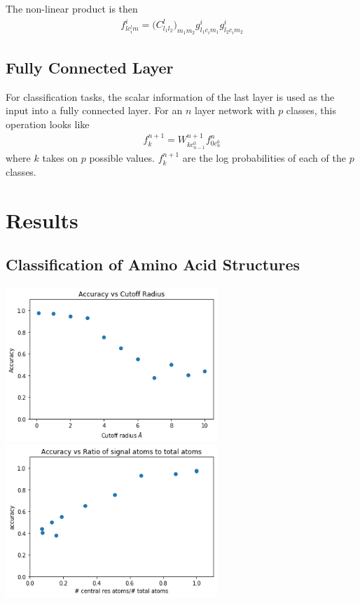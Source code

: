 \documentclass{article}
\begin{document}
The non-linear product is then
\begin{align}
    f^{i}_{lc^l_im} = \big(C^l_{l_1l_2}\big)_{m_1m_2} g^{i}_{l_1c_{i}m_1} g^{i}_{l_2c_{i}m_2}
\end{align}

\subsection{Fully Connected Layer}
For classification tasks, the scalar information of the last layer is used as the input into a fully connected layer. For an $n$ layer network with $p$ classes, this operation looks like
\begin{align}
    f^{n+1}_k = W^{n+1}_{kc^0_{n-1}} f^{n}_{0c^0_{n}}
\end{align}
where $k$ takes on $p$ possible values. $f^{n+1}_k$ are the log probabilities of each of the $p$ classes.

\section{Results}

\subsection{Classification of Amino Acid Structures}

\includegraphics[width=8cm]{accVsR.png}\\
\includegraphics[width=8cm]{accVsNoise.png}
\end{document}
